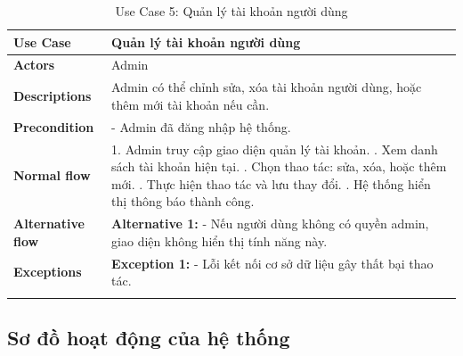 \begin{longtable}{|p{}|p{}|}
    \hline
    \textbf{Use Case}         & Quản lý tài khoản người dùng                                                       \\
    \hline
    \textbf{Actors}           & Admin                                                                              \\
    \hline
    \textbf{Descriptions}     & Admin có thể chỉnh sửa, xóa tài khoản người dùng, hoặc thêm mới tài khoản nếu cần. \\
    \hline
    \textbf{Precondition}     &
    - Admin đã đăng nhập hệ thống.                                                                                 \\
    \hline
    \textbf{Normal flow}      &
    1. Admin truy cập giao diện quản lý tài khoản. \newline
    2. Xem danh sách tài khoản hiện tại. \newline
    3. Chọn thao tác: sửa, xóa, hoặc thêm mới. \newline
    4. Thực hiện thao tác và lưu thay đổi. \newline
    5. Hệ thống hiển thị thông báo thành công.                                                                     \\
    \hline
    \textbf{Alternative flow} &
    \textbf{Alternative 1:} \newline
    - Nếu người dùng không có quyền admin, giao diện không hiển thị tính năng này.                                 \\
    \hline
    \textbf{Exceptions}       &
    \textbf{Exception 1:} \newline
    - Lỗi kết nối cơ sở dữ liệu gây thất bại thao tác.                                                             \\
    \hline
    \caption{Use Case 5: Quản lý tài khoản người dùng}
    \label{tab:usecase5}
\end{longtable}


\subsection{Sơ đồ hoạt động của hệ thống}

